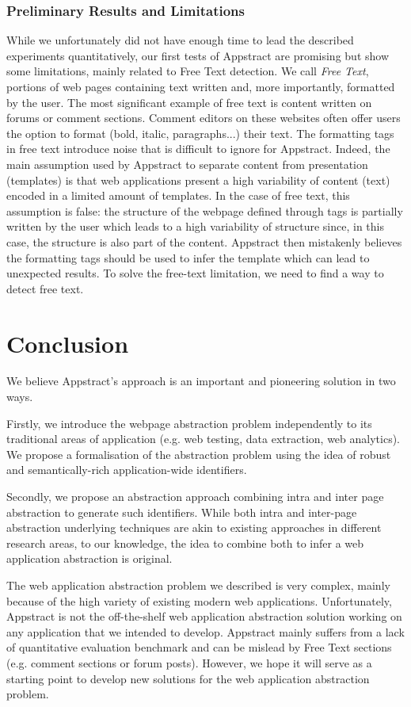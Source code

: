 \subsubsection{Preliminary Results and Limitations}
While we unfortunately did not have enough time to lead the described experiments quantitatively, our first tests of Appstract are promising but show some limitations, mainly related to Free Text detection.
We call \textit{Free Text}, portions of web pages containing text written and, more importantly, formatted by the user. The most significant example of free text is content written on forums or comment sections.  Comment editors on these websites often offer users the option to format (bold, italic, paragraphs...) their text. The formatting tags in free text introduce noise that is difficult to ignore for Appstract. Indeed, the main assumption used by Appstract to separate content from presentation (templates) is that web applications present a high variability of content (text) encoded in a limited amount of templates. In the case of free text, this assumption is false: the structure of the webpage defined through tags is partially written by the user which leads to a high variability of structure since, in this case, the structure is also part of the content. Appstract then mistakenly believes the formatting tags should be used to infer the template which can lead to unexpected results.
To solve the free-text limitation, we need to find a way to detect free text.

\section{Conclusion}\label{sec:conclusion}
We believe Appstract's approach is an important and pioneering solution in two ways.

Firstly, we introduce the webpage abstraction problem independently to its traditional areas of application (e.g. web testing, data extraction, web analytics). We propose a formalisation of the abstraction problem using the idea of robust and semantically-rich application-wide identifiers.

Secondly, we propose an abstraction approach combining intra and inter page abstraction to generate such identifiers. While both intra and inter-page abstraction underlying techniques are akin to existing approaches in different research areas, to our knowledge, the idea to combine both to infer a web application abstraction is original.

The web application abstraction problem we described is very complex, mainly because of the high variety of existing modern web applications. Unfortunately, Appstract is not the off-the-shelf web application abstraction solution working on any application that we intended to develop. Appstract mainly suffers from a lack of quantitative evaluation benchmark and can be mislead by Free Text sections (e.g. comment sections or forum posts). However, we hope it will serve as a starting point to develop new solutions for the web application abstraction problem.